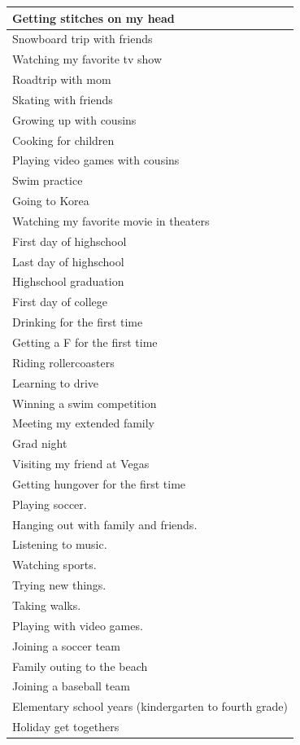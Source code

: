 \documentclass[
  .7em,
  letterpaper,
  DIV=11,
  numbers=noendperiod]{scrartcl}
\begin{document}
\begin{table}
\begin{tabular}{l}
\hline
Getting stitches on my head\\
\hline
Snowboard trip with friends\\
\hline
Watching my favorite tv show\\
\hline
Roadtrip with mom\\
\hline
Skating with friends\\
\hline
Growing up with cousins\\
\hline
Cooking for children\\
\hline
Playing video games with cousins\\
\hline
Swim practice\\
\hline
Going to Korea\\
\hline
Watching my favorite movie in theaters\\
\hline
First day of highschool\\
\hline
Last day of highschool\\
\hline
Highschool graduation\\
\hline
First day of college\\
\hline
Drinking for the first time\\
\hline
Getting a F for the first time\\
\hline
Riding rollercoasters\\
\hline
Learning to drive\\
\hline
Winning a swim competition\\
\hline
Meeting my extended family\\
\hline
Grad night\\
\hline
Visiting my friend at Vegas\\
\hline
Getting hungover for the first time\\
\hline
Playing soccer.\\
\hline
Hanging out with family and friends.\\
\hline
Listening to music.\\
\hline
Watching sports.\\
\hline
Trying new things.\\
\hline
Taking walks.\\
\hline
Playing with video games.\\
\hline
Joining a soccer team\\
\hline
Family outing to the beach\\
\hline
Joining a baseball team\\
\hline
Elementary school years (kindergarten to fourth grade)\\
\hline
Holiday get togethers\\

\end{tabular}
\end{table}
\end{document}
